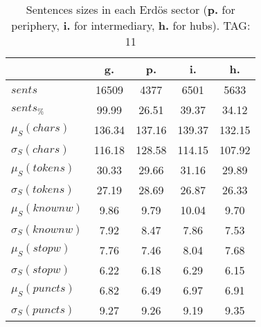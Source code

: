 \begin{table}[h!]
\begin{center}
\begin{tabular}{| l || c | c | c | c |}\hline
 & {\bf g.} & {\bf p.} & {\bf i.} & {\bf h.} \\\hline\hline
$sents$ & 16509  & 4377  & 6501  & 5633 \\
$sents_{\%}$ & 99.99  & 26.51  & 39.37  & 34.12 \\\hline
$\mu_S(chars)$ & 136.34  & 137.16  & 139.37  & 132.15 \\
$\sigma_S(chars)$ & 116.18  & 128.58  & 114.15  & 107.92 \\\hline
$\mu_S(tokens)$ & 30.33  & 29.66  & 31.16  & 29.89 \\
$\sigma_S(tokens)$ & 27.19  & 28.69  & 26.87  & 26.33 \\\hline
$\mu_S(knownw)$ & 9.86  & 9.79  & 10.04  & 9.70 \\
$\sigma_S(knownw)$ & 7.92  & 8.47  & 7.86  & 7.53 \\\hline
$\mu_S(stopw)$ & 7.76  & 7.46  & 8.04  & 7.68 \\
$\sigma_S(stopw)$ & 6.22  & 6.18  & 6.29  & 6.15 \\\hline
$\mu_S(puncts)$ & 6.82  & 6.49  & 6.97  & 6.91 \\
$\sigma_S(puncts)$ & 9.27  & 9.26  & 9.19  & 9.35 \\\hline
\end{tabular}
\caption{Sentences sizes in each Erd\"os sector ({{\bf p.}} for periphery, {{\bf i.}} for intermediary, {{\bf h.}} for hubs). TAG: 11}
\end{center}
\end{table}